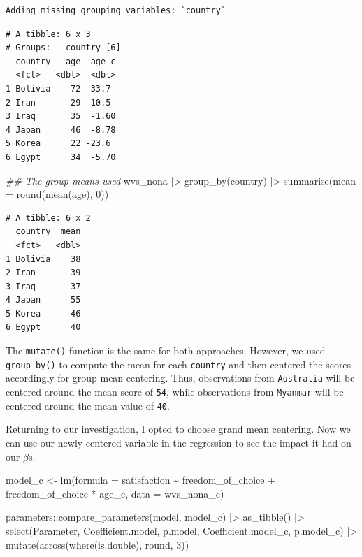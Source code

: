 \documentclass[
  letterpaper,
]{krantz}
\makeatletter
\newenvironment{Shaded}{\begin{snugshade}}{\end{snugshade}}
\newcommand{\AttributeTok}[1]{\textcolor[rgb]{0.40,0.45,0.13}{#1}}
\newcommand{\DecValTok}[1]{\textcolor[rgb]{0.68,0.00,0.00}{#1}}
\newcommand{\DocumentationTok}[1]{\textcolor[rgb]{0.37,0.37,0.37}{\textit{#1}}}
\newcommand{\FunctionTok}[1]{\textcolor[rgb]{0.28,0.35,0.67}{#1}}
\newcommand{\NormalTok}[1]{\textcolor[rgb]{0.00,0.23,0.31}{#1}}
\newcommand{\OtherTok}[1]{\textcolor[rgb]{0.00,0.23,0.31}{#1}}
\newcommand{\SpecialCharTok}[1]{\textcolor[rgb]{0.37,0.37,0.37}{#1}}
\newenvironment{kframe}{%
\medskip{}
\setlength{\fboxsep}{.8em}
 \def\at@end@of@kframe{}%
 \ifinner\ifhmode%
  \def\at@end@of@kframe{\end{minipage}}%
  \begin{minipage}{\columnwidth}%
 \fi\fi%
 \def\FrameCommand##1{\hskip\@totalleftmargin \hskip-\fboxsep
 \colorbox{shadecolor}{##1}\hskip-\fboxsep
     \hskip-\linewidth \hskip-\@totalleftmargin \hskip\columnwidth}%
 \MakeFramed {\advance\hsize-\width
   \@totalleftmargin\z@ \linewidth\hsize
   \@setminipage}}%
 {\par\unskip\endMakeFramed%
 \at@end@of@kframe}
\renewenvironment{Shaded}{\begin{kframe}}{\end{kframe}}
\makeatother
\begin{document}
\begin{verbatim}
Adding missing grouping variables: `country`
\end{verbatim}

\begin{verbatim}
# A tibble: 6 x 3
# Groups:   country [6]
  country   age  age_c
  <fct>   <dbl>  <dbl>
1 Bolivia    72  33.7 
2 Iran       29 -10.5 
3 Iraq       35  -1.60
4 Japan      46  -8.78
5 Korea      22 -23.6 
6 Egypt      34  -5.70
\end{verbatim}

\begin{Shaded}
\begin{Highlighting}[]
\DocumentationTok{\#\# The group means used}
\NormalTok{wvs\_nona }\SpecialCharTok{|\textgreater{}}
  \FunctionTok{group\_by}\NormalTok{(country) }\SpecialCharTok{|\textgreater{}}
  \FunctionTok{summarise}\NormalTok{(}\AttributeTok{mean =} \FunctionTok{round}\NormalTok{(}\FunctionTok{mean}\NormalTok{(age), }\DecValTok{0}\NormalTok{))}
\end{Highlighting}
\end{Shaded}

\begin{verbatim}
# A tibble: 6 x 2
  country  mean
  <fct>   <dbl>
1 Bolivia    38
2 Iran       39
3 Iraq       37
4 Japan      55
5 Korea      46
6 Egypt      40
\end{verbatim}

The \texttt{mutate()} function is the same for both approaches. However,
we used \texttt{group\_by()} to compute the mean for each
\texttt{country} and then centered the scores accordingly for group mean
centering. Thus, observations from \texttt{Australia} will be centered
around the mean score of \texttt{54}, while observations from
\texttt{Myanmar} will be centered around the mean value of \texttt{40}.

Returning to our investigation, I opted to choose grand mean centering.
Now we can use our newly centered variable in the regression to see the
impact it had on our \(\beta\)s.

\begin{Shaded}
\begin{Highlighting}[]
\NormalTok{model\_c }\OtherTok{\textless{}{-}} \FunctionTok{lm}\NormalTok{(}\AttributeTok{formula =}\NormalTok{ satisfaction }\SpecialCharTok{\textasciitilde{}}
\NormalTok{                freedom\_of\_choice }\SpecialCharTok{+}
\NormalTok{                freedom\_of\_choice }\SpecialCharTok{*}\NormalTok{ age\_c,}
              \AttributeTok{data =}\NormalTok{ wvs\_nona\_c)}

\NormalTok{parameters}\SpecialCharTok{::}\FunctionTok{compare\_parameters}\NormalTok{(model, model\_c) }\SpecialCharTok{|\textgreater{}}
  \FunctionTok{as\_tibble}\NormalTok{() }\SpecialCharTok{|\textgreater{}}
  \FunctionTok{select}\NormalTok{(Parameter, Coefficient.model, p.model, Coefficient.model\_c, p.model\_c) }\SpecialCharTok{|\textgreater{}}
  \FunctionTok{mutate}\NormalTok{(}\FunctionTok{across}\NormalTok{(}\FunctionTok{where}\NormalTok{(is.double), round, }\DecValTok{3}\NormalTok{))}
\end{Highlighting}
\end{Shaded}
\end{document}
